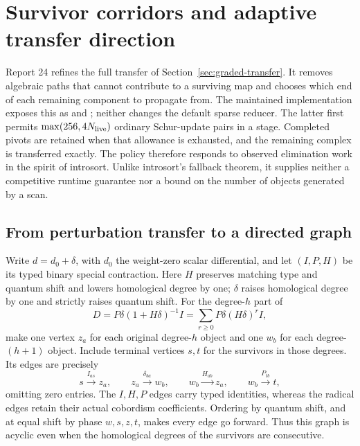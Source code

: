 \section{Survivor corridors and adaptive transfer direction}
\label{sec:corridor-transfer}

Report 24 refines the full transfer of Section~\ref{sec:graded-transfer}.
It removes algebraic paths that cannot contribute to a surviving map and
chooses which end of each remaining component to propagate from.  The
maintained implementation exposes this as  and
; neither changes the default sparse reducer.
The latter first permits $\max(256,4N_{\rm live})$ ordinary Schur-update
pairs in a stage.  Completed pivots are retained when that allowance is
exhausted, and the remaining complex is transferred exactly.  The policy
therefore responds to observed elimination work in the spirit of introsort.
Unlike introsort's fallback theorem, it supplies neither a competitive
runtime guarantee nor a bound on the number of objects generated by a scan.

\subsection{From perturbation transfer to a directed graph}

Write $d=d_0+\delta$, with $d_0$ the weight-zero scalar differential, and
let $(I,P,H)$ be its typed binary special contraction.  Here $H$ preserves
matching type and quantum shift and lowers homological degree by one;
$\delta$ raises homological degree by one and strictly raises quantum shift.
For the degree-$h$ part of
\[
 D=P\delta(1+H\delta)^{-1}I
   =\sum_{r\ge0}P\delta(H\delta)^r I,
\]
make one vertex $z_a$ for each original degree-$h$ object and one $w_b$
for each degree-$(h+1)$ object.  Include terminal vertices $s,t$ for the
survivors in those degrees.  Its edges are precisely
\[
 s\xrightarrow{I_{as}}z_a,\qquad
 z_a\xrightarrow{\delta_{ba}}w_b,\qquad
 w_b\xrightarrow{H_{ab}}z_a,\qquad
 w_b\xrightarrow{P_{tb}}t,
\]
omitting zero entries.  The $I,H,P$ edges carry typed identities, whereas
the radical edges retain their actual cobordism coefficients.  Ordering by
quantum shift, and at equal shift by phase $w,s,z,t$, makes every edge go
forward.  Thus this graph is acyclic even when the homological degrees
of the survivors are consecutive.

